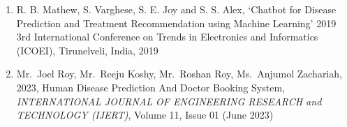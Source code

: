 \documentclass[onecolumn]{article}
\begin{document}
\begin{enumerate}
    \item R. B. Mathew, S. Varghese, S. E. Joy and S. S. Alex, `Chatbot for Disease Prediction and Treatment Recommendation using Machine Learning' 2019 3rd International Conference on Trends in Electronics and Informatics (ICOEI), Tirunelveli, India, 2019
    
    \item Mr.~Joel Roy, Mr.~Reeju Koshy, Mr.~Roshan Roy, Ms.~Anjumol Zachariah, 2023, Human Disease Prediction And Doctor Booking System, \textit{INTERNATIONAL JOURNAL OF ENGINEERING RESEARCH and TECHNOLOGY (IJERT)}, Volume 11, Issue 01 (June 2023)
\end{enumerate}
\end{document}
